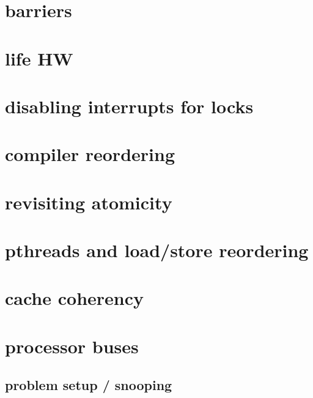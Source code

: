\section{barriers}


\section{life HW}


\section{disabling interrupts for locks}


%

\section{compiler reordering}


\section{revisiting atomicity}


\section{pthreads and load/store reordering}




\section{cache coherency}
\section{processor buses}


\subsection{problem setup / snooping}


